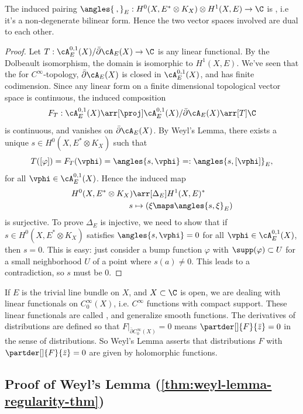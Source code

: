 \documentclass[11pt]{report}
\begin{document}
\begin{cor} \label{cor:serre-duality}
The induced pairing $\angles{\:,}_E:H^0(X,E^*\otimes K_X) \otimes H^1(X,E) \to \C$ is , i.e it's a non-degenerate bilinear form. Hence the two vector spaces involved are dual to each other.
\end{cor}

\begin{proof}
Let $T:\cA_E^{0,1}(X)/\bar \partial \cA_E(X)\to \C$ is any linear functional. By the Dolbeault isomorphism, the domain is isomorphic to $H^1(X,E)$. We've seen that the for $C^\infty$-topology, $\bar \partial \cA_E(X)$ is closed in $\cA_E^{0,1}(X)$, and has finite codimension. Since any linear form on a finite dimensional topological vector space is continuous, the induced composition
\[
F_T:\cA_E^{0,1}(X) \arr[\proj] \cA_E^{0,1}(X)/\bar{\partial}\cA_E(X)\arr[T]\C
\]
is continuous, and vanishes on $\bar \partial \cA_E(X)$. By Weyl's Lemma, there exists a unique $s \in H^0(X,E^*\otimes K_X)$ such that
\[
T([ \varphi]) =F_T(\vphi) =\angles {s,\vphi} =: \angles{s,[\vphi]}_E,
\]
for all $\vphi \in \cA_E^{0,1}(X)$. Hence the induced map
\begin{align*}
    H^0(X,E^*\otimes K_X) &\arr[\Delta_E] H^1(X,E)^* \\
    s & \mapsto (\xi \maps \angles{s,\xi}_E)
\end{align*}
is surjective. To prove $\Delta_E$ is injective, we need to show that if $s \in H^0(X,E^*\otimes K_X)$ satisfies $\angles{s, \vphi}=0$ for all $\vphi \in \cA_{E}^{0,1}(X)$, then $s=0$. This is easy: just consider a bump function $\varphi$ with $\supp (\varphi) \subset U$ for a small neighborhood $U$ of a point where $s(a)\neq 0$. This leads to a contradiction, so $s$ must be $0$.
\end{proof}

\begin{rmk}
If $E$ is the trivial line bundle on $X$, and $X \subset \C$ is open, we are dealing with linear functionals on $C_0^\infty(X)$, i.e. $C^\infty$ functions with compact support. These linear functionals are called , and generalize smooth functions. The derivatives of distributions are defined so that $F|_{\bar \partial C_0^\infty (X)}=0$ means $\partder[]{F}{\bar z}=0$ in the sense of distributions. So Weyl's Lemma asserts that distributions $F$ with $\partder[]{F}{\bar z}=0$ are given by holomorphic functions.
\end{rmk}

\subsection{\texorpdfstring{Proof of Weyl's Lemma (\cref{thm:weyl-lemma-regularity-thm})}{Proof of Weyl's Lemma}}
\end{document}
